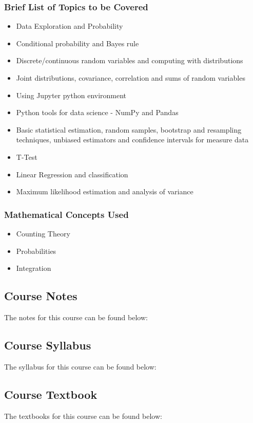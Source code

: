 {\begin{highlight}[\CSPBDataSci]
        \subsubsection*{Brief List of Topics to be Covered}
    
        \begin{itemize}
            \item Data Exploration and Probability
            \item Conditional probability and Bayes rule
            \item Discrete/continuous random variables and computing with distributions
            \item Joint distributions, covariance, correlation and sums of random variables
            \item Using Jupyter python environment
            \item Python tools for data science - NumPy and Pandas
            \item Basic statistical estimation, random samples, bootstrap and resampling techniques, unbiased estimators and confidence intervals for measure data
            \item T-Test
            \item Linear Regression and classification
            \item Maximum likelihood estimation and analysis of variance
        \end{itemize}
        
        \subsubsection*{Mathematical Concepts Used}
        
        \begin{itemize}
            \item Counting Theory
            \item Probabilities
            \item Integration
        \end{itemize}
    \end{highlight}
}

\subsection{Course Notes}

The notes for this course can be found below: \coursedoc{\CSPBDataSciCourseNotes}

\subsection{Course Syllabus}

The syllabus for this course can be found below: \coursedoc{\CSPBDataSciSyllabus}

\subsection{Course Textbook}

The textbooks for this course can be found below: \coursedoc{{\scriptsize{\CSPBDataSciLearnDSTextbook}}} \coursedoc{{\small{\CSPBDataSciPyForDSTextbook}}}